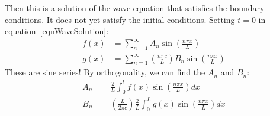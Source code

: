\documentclass[../Main.tex]{subfiles}
\begin{document}
Then this is a solution of the wave equation that satisfies the boundary conditions. It does not yet satisfy the initial conditions. Setting $t = 0$ in equation~\ref{eqnWaveSolution}:
\begin{align*}
    f(x) &= \sum_{n=1}^{\infty} A_n \sin\left(\frac{n \pi x}{L}\right) \\
    g(x) &= \sum_{n=1}^{\infty} \left(\frac{n\pi c}{L}\right)B_n \sin\left(\frac{n\pi x}{L}\right)
\end{align*}
These are sine series! By orthogonality, we can find the $A_n$ and $B_n$:
\begin{align*}
    A_n &= \frac{2}{L} \int_{0}^{l} f(x) \sin\left(\frac{n \pi x}{L}\right) dx \\
    B_n &= \left(\frac{L}{2\pi c}\right)\frac{2}{L} \int_{0}^{L} g(x) \sin\left(\frac{n \pi x}{L}\right) dx 
\end{align*}
\end{document}
